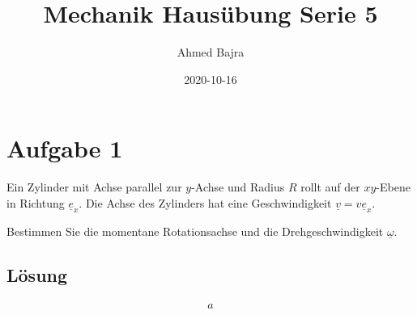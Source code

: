 \documentclass{article}
\title{Mechanik Hausübung Serie 5}
\author{Ahmed Bajra}
\date{2020-10-16}
\begin{document}
    \maketitle
    \section{Aufgabe 1}

    Ein Zylinder mit Achse parallel zur $y$-Achse und Radius $R$ rollt auf der $xy$-Ebene in Richtung $\underline{e}_x$. Die Achse des Zylinders hat eine Geschwindigkeit $\underline{v} = v\underline{e}_x$.
    
    Bestimmen Sie die momentane Rotationsachse und die Drehgeschwindigkeit $\underline\omega$.

    \subsection{Lösung}

    \begin{gather*}
        a
    \end{gather*}
\end{document}

